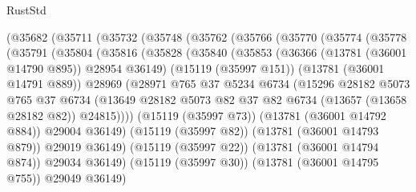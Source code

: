 \begin{lexlean}{RustStd}
\begin{coremodule}
          (@35682
            (@35711
              (@35732
                (@35748
                  (@35762
                    (@35766
                      (@35770
                        (@35774
                          (@35778
                            (@35791
                              (@35804
                                (@35816
                                  (@35828
                                    (@35840
                                      (@35853
                                        (@36366 (@13781 (@36001 @14790 @895)) @28954 @36149)
                                        (@15119 (@35997 @151))
                                        (@13781 (@36001 @14791 @889))
                                        @28969
                                        (@28971
                                          @765
                                          @37
                                          @5234
                                          @6734
                                          (@15296
                                            @28182
                                            @5073
                                            @765
                                            @37
                                            @6734
                                            (@13649
                                              @28182
                                              @5073
                                              @82
                                              @37
                                              @82
                                              @6734
                                              (@13657 (@13658 @28182 @82))
                                              @24815))))
                                      (@15119 (@35997 @73))
                                      (@13781 (@36001 @14792 @884))
                                      @29004
                                      @36149)
                                    (@15119 (@35997 @82))
                                    (@13781 (@36001 @14793 @879))
                                    @29019
                                    @36149)
                                  (@15119 (@35997 @22))
                                  (@13781 (@36001 @14794 @874))
                                  @29034
                                  @36149)
                                (@15119 (@35997 @30))
                                (@13781 (@36001 @14795 @755))
                                @29049
                                @36149)

\end{coremodule}
\end{lexlean}
